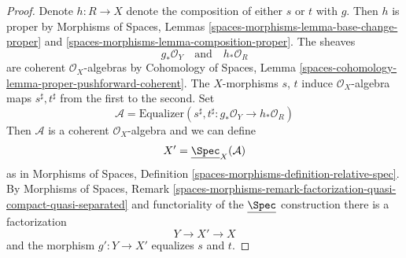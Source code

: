 \begin{proof}
Denote $h : R \to X$ denote the composition of either $s$ or $t$
with $g$. Then $h$ is proper by Morphisms of Spaces, Lemmas
\ref{spaces-morphisms-lemma-base-change-proper} and
\ref{spaces-morphisms-lemma-composition-proper}.
The sheaves
$$
g_*\mathcal{O}_Y
\quad\text{and}\quad
h_*\mathcal{O}_R
$$
are coherent $\mathcal{O}_X$-algebras by Cohomology of Spaces, Lemma
\ref{spaces-cohomology-lemma-proper-pushforward-coherent}.
The $X$-morphisms $s$, $t$ induce $\mathcal{O}_X$-algebra maps
$s^\sharp, t^\sharp$ from the first to the second.
Set
$$
\mathcal{A} = \text{Equalizer}\left(s^\sharp, t^\sharp :
g_*\mathcal{O}_Y \longrightarrow h_*\mathcal{O}_R\right)
$$
Then $\mathcal{A}$ is a coherent $\mathcal{O}_X$-algebra and we
can define
$$
X' = \underline{\Spec}_X(\mathcal{A})
$$
as in Morphisms of Spaces, Definition
\ref{spaces-morphisms-definition-relative-spec}.
By Morphisms of Spaces, Remark
\ref{spaces-morphisms-remark-factorization-quasi-compact-quasi-separated}
and functoriality of the $\underline{\Spec}$ construction
there is a factorization
$$
Y \longrightarrow X' \longrightarrow X
$$
and the morphism $g' : Y \to X'$ equalizes $s$ and $t$.


\end{proof}
